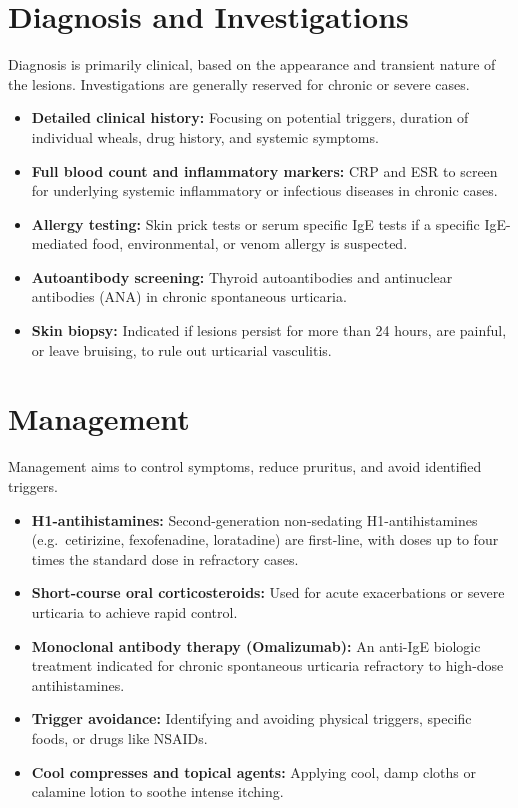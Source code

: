\section*{Diagnosis and Investigations}
Diagnosis is primarily clinical, based on the appearance and transient nature of the lesions. Investigations are generally reserved for chronic or severe cases.
\begin{itemize}
    \item \textbf{Detailed clinical history:} Focusing on potential triggers, duration of individual wheals, drug history, and systemic symptoms.
    \item \textbf{Full blood count and inflammatory markers:} CRP and ESR to screen for underlying systemic inflammatory or infectious diseases in chronic cases.
    \item \textbf{Allergy testing:} Skin prick tests or serum specific IgE tests if a specific IgE-mediated food, environmental, or venom allergy is suspected.
    \item \textbf{Autoantibody screening:} Thyroid autoantibodies and antinuclear antibodies (ANA) in chronic spontaneous urticaria.
    \item \textbf{Skin biopsy:} Indicated if lesions persist for more than 24 hours, are painful, or leave bruising, to rule out urticarial vasculitis.
\end{itemize}

\section*{Management}
Management aims to control symptoms, reduce pruritus, and avoid identified triggers.
\begin{itemize}
    \item \textbf{H1-antihistamines:} Second-generation non-sedating H1-antihistamines (e.g.\ cetirizine, fexofenadine, loratadine) are first-line, with doses up to four times the standard dose in refractory cases.
    \item \textbf{Short-course oral corticosteroids:} Used for acute exacerbations or severe urticaria to achieve rapid control.
    \item \textbf{Monoclonal antibody therapy (Omalizumab):} An anti-IgE biologic treatment indicated for chronic spontaneous urticaria refractory to high-dose antihistamines.
    \item \textbf{Trigger avoidance:} Identifying and avoiding physical triggers, specific foods, or drugs like NSAIDs.
    \item \textbf{Cool compresses and topical agents:} Applying cool, damp cloths or calamine lotion to soothe intense itching.
\end{itemize}


